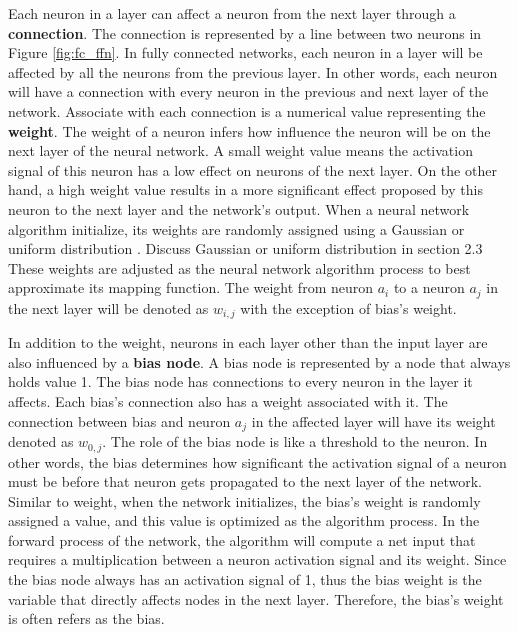 Each neuron in a layer can affect a neuron from the next layer through a \textbf{connection}. The connection is represented by a line between two neurons in Figure \ref{fig:fc_ffn}. In fully connected networks, each neuron in a layer will be affected by all the neurons from the previous layer. In other words, each neuron will have a connection with every neuron in the previous and next layer of the network. Associate with each connection is a numerical value representing the \textbf{weight}. The weight of a neuron infers how influence the neuron will be on the next layer of the neural network. A small weight value means the activation signal of this neuron has a low effect on neurons of the next layer. On the other hand, a high weight value results in a more significant effect proposed by this neuron to the next layer and the network's output. When a neural network algorithm initialize, its weights are randomly assigned using a Gaussian or uniform distribution \cite{lecun2015deep}. {\color{red} Discuss Gaussian or uniform distribution in section 2.3} These weights are adjusted as the neural network algorithm process to best approximate its mapping function. The weight from neuron $a_i$ to a neuron $a_j$ in the next layer will be denoted as $w_{i,j}$ with the exception of bias's weight.

In addition to the weight, neurons in each layer other than the input layer are also influenced by a \textbf{bias node}. A bias node is represented by a node that always holds value 1. The bias node has connections to every neuron in the layer it affects. Each bias's connection also has a weight associated with it. The connection between bias and neuron $a_j$ in the affected layer will have its weight denoted as $w_{0,j}$. The role of the bias node is like a threshold to the neuron. In other words, the bias determines how significant the activation signal of a neuron must be before that neuron gets propagated to the next layer of the network. Similar to weight, when the network initializes, the bias's weight is randomly assigned a value, and this value is optimized as the algorithm process. In the forward process of the network, the algorithm will compute a net input that requires a multiplication between a neuron activation signal and its weight. Since the bias node always has an activation signal of 1, thus the bias weight is the variable that directly affects nodes in the next layer. Therefore, the bias's weight is often refers as the bias.

